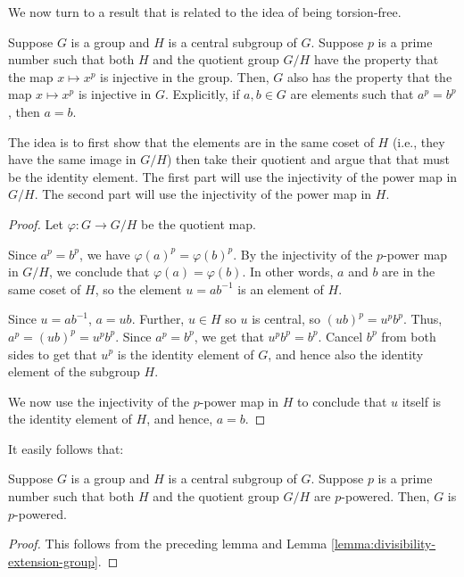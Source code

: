 We now turn to a result that is related to the idea of being torsion-free.

\begin{lemma}\label{lemma:powering-injective-extension-group}
  Suppose $G$ is a group and $H$ is a central subgroup of $G$. Suppose
  $p$ is a prime number such that both $H$ and the quotient group
  $G/H$ have the property that the map $x \mapsto x^p$ is injective in
  the group. Then, $G$ also has the property that the map $x \mapsto
  x^p$ is injective in $G$. Explicitly, if $a,b \in G$ are elements
  such that $a^p = b^p$, then $a = b$.
\end{lemma}

The idea is to first show that the elements are in the same coset of
$H$ (i.e., they have the same image in $G/H$) then take their quotient
and argue that that must be the identity element. The first part will
use the injectivity of the power map in $G/H$. The second part will
use the injectivity of the power map in $H$.

\begin{proof}
  Let $\varphi: G \to G/H$ be the quotient map.

  Since $a^p = b^p$, we have $\varphi(a)^p = \varphi(b)^p$. By the injectivity
  of the $p$-power map in $G/H$, we conclude that $\varphi(a) =
  \varphi(b)$. In other words, $a$ and $b$ are in the same coset of $H$,
  so the element $u = ab^{-1}$ is an element of $H$.

  Since $u = ab^{-1}$, $a = ub$. Further, $u \in H$ so $u$ is central,
  so $(ub)^p = u^pb^p$. Thus, $a^p = (ub)^p = u^pb^p$. Since $a^p =
  b^p$, we get that $u^pb^p = b^p$. Cancel $b^p$ from both sides to
  get that $u^p$ is the identity element of $G$, and hence also the
  identity element of the subgroup $H$.

  We now use the injectivity of the $p$-power map in $H$ to conclude
  that $u$ itself is the identity element of $H$, and hence, $a = b$.
\end{proof}

It easily follows that:

\begin{lemma}\label{lemma:powering-extension-group}
  Suppose $G$ is a group and $H$ is a central subgroup of $G$. Suppose
  $p$ is a prime number such that both $H$ and the quotient group
  $G/H$ are $p$-powered. Then, $G$ is $p$-powered.
\end{lemma}

\begin{proof}
  This follows from the preceding lemma and Lemma \ref{lemma:divisibility-extension-group}.
\end{proof}

